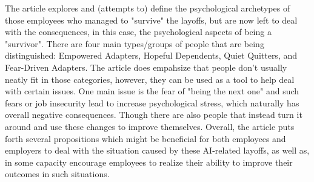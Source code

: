 \documentclass[letterpaper,11pt]{article}
\begin{document}
The article explores and (attempts to) define the psychological archetypes of those
employees who managed to "survive" the layoffs, but are now left to deal with
the consequences, in this case, the psychological aspects of being a "survivor".
There are four main types/groups of people that are being distinguished: Empowered
Adapters, Hopeful Dependents, Quiet Quitters, and Fear-Driven Adapters. The article
does empahsize that people don't usually neatly fit in those categories, however, they
can be used as a tool to help deal with certain issues. One main issue is the fear of
"being the next one" and such fears or job insecurity lead to increase psychological
stress, which naturally has overall negative consequences. Though there are also people
that instead turn it around and use these changes to improve themselves. Overall, the
article puts forth several propositions which might be beneficial for both employees
and employers to deal with the situation caused by these AI-related layoffs, as well as,
in some capacity encourage employees to realize their ability to improve their outcomes
in such situations.




\end{document}
